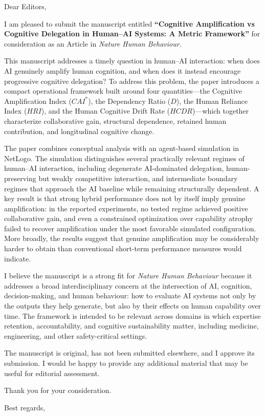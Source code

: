 \documentclass[11pt]{letter}
\begin{document}
\begin{letter}{}

\opening{Dear Editors,}

I am pleased to submit the manuscript entitled \textbf{``Cognitive Amplification vs Cognitive Delegation in Human--AI Systems: A Metric Framework''} for consideration as an Article in \textit{Nature Human Behaviour}.

This manuscript addresses a timely question in human--AI interaction: when does AI genuinely amplify human cognition, and when does it instead encourage progressive cognitive delegation? To address this problem, the paper introduces a compact operational framework built around four quantities---the Cognitive Amplification Index (\(CAI^*\)), the Dependency Ratio (\(D\)), the Human Reliance Index (\(HRI\)), and the Human Cognitive Drift Rate (\(HCDR\))---which together characterize collaborative gain, structural dependence, retained human contribution, and longitudinal cognitive change.

The paper combines conceptual analysis with an agent-based simulation in NetLogo. The simulation distinguishes several practically relevant regimes of human--AI interaction, including degenerate AI-dominated delegation, human-preserving but weakly competitive interaction, and intermediate boundary regimes that approach the AI baseline while remaining structurally dependent. A key result is that strong hybrid performance does not by itself imply genuine amplification: in the reported experiments, no tested regime achieved positive collaborative gain, and even a constrained optimization over capability atrophy failed to recover amplification under the most favorable simulated configuration. More broadly, the results suggest that genuine amplification may be considerably harder to obtain than conventional short-term performance measures would indicate.

I believe the manuscript is a strong fit for \textit{Nature Human Behaviour} because it addresses a broad interdisciplinary concern at the intersection of AI, cognition, decision-making, and human behaviour: how to evaluate AI systems not only by the outputs they help generate, but also by their effects on human capability over time. The framework is intended to be relevant across domains in which expertise retention, accountability, and cognitive sustainability matter, including medicine, engineering, and other safety-critical settings.

The manuscript is original, has not been submitted elsewhere, and I approve its submission. I would be happy to provide any additional material that may be useful for editorial assessment.

Thank you for your consideration.

\closing{Best regards,}

\end{letter}
\end{document}
